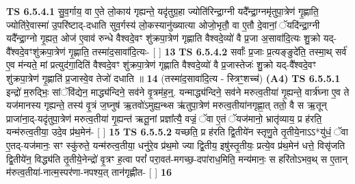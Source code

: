 \documentclass[17pt]{extarticle}
\begin{document}
                                        \textbf{ TS 6.5.4.1} \newline
                  सु॒व॒र्गाय॒ वा ए॒ते लो॒काय॑ गृह्यन्ते॒ यदृ॑तुग्र॒हा ज्योति॑रिन्द्रा॒ग्नी यदै᳚न्द्रा॒ग्नमृ॑तुपा॒त्रेण॑ गृ॒ह्णाति॒ ज्योति॑रे॒वास्मा॑ उ॒परि॑ष्टाद्-दधाति सुव॒र्गस्य॑ लो॒कस्यानु॑ख्यात्या ओजो॒भृतौ॒ वा ए॒तौ दे॒वानां॒ ॅयदि॑न्द्रा॒ग्नी यदै᳚न्द्रा॒ग्नो गृ॒ह्यत॒ ओज॑ ए॒वाव॑ रुन्धे वैश्वदे॒वꣳ शु॑क्रपा॒त्रेण॑ गृह्णाति वैश्वदे॒व्यो॑ वै प्र॒जा अ॒सावा॑दि॒त्यः शु॒क्रो यद्-वै᳚श्वदे॒वꣳशु॑क्रपा॒त्रेण॑ गृ॒ह्णाति॒ तस्मा॑द॒सावा॑दि॒त्यः- [  ] \textbf{  13} \newline
                  \newline
                                \textbf{ TS 6.5.4.2} \newline
                  सर्वाः᳚ प्र॒जाः प्र॒त्यङ्ङुदे॑ति॒ तस्मा॒थ् सर्व॑ ए॒व म॑न्यते॒ मां प्रत्युद॑गा॒दिति॑ वैश्वदे॒वꣳ शु॑क्रपा॒त्रेण॑ गृह्णाति वैश्वदे॒व्यो॑ वै प्र॒जास्तेजः॑ शु॒क्रो यद्-वै᳚श्वदे॒वꣳ शु॑क्रपा॒त्रेण॑ गृ॒ह्णाति॑ प्र॒जास्वे॒व तेजो॑ दधाति ॥ \textbf{  14} \newline
                  \newline
                      (तस्मा॑द॒सावा॑दि॒त्य - स्त्रिꣳ॒॒शच्च॑)  \textbf{(A4)} \newline \newline
                                        \textbf{ TS 6.5.5.1} \newline
                  इन्द्रो॑ म॒रुद्भिः॒ सांॅवि॑द्येन॒ माद्ध्य॑न्दिने॒ सव॑ने वृ॒त्रम॑ह॒न्॒. यन्माद्ध्य॑न्दिने॒ सव॑ने मरुत्व॒तीया॑ गृ॒ह्यन्ते॒ वार्त्र॑घ्ना ए॒व ते यज॑मानस्य गृह्यन्ते॒ तस्य॑ वृ॒त्रं ज॒घ्नुष॑ ऋ॒तवो॑ऽमुह्य॒न्थ्स ऋ॑तुपा॒त्रेण॑ मरुत्व॒तीया॑नगृह्णा॒त् ततो॒ वै स ऋ॒तून् प्राजा॑ना॒द्-यदृ॑तुपा॒त्रेण॑ मरुत्व॒तीया॑ गृ॒ह्यन्त॑ ऋतू॒नां प्रज्ञा᳚त्यै॒ वज्रं॒ ॅवा ए॒तं ॅयज॑मानो॒ भ्रातृ॑व्याय॒ प्र ह॑रति॒ यन्म॑रुत्व॒तीया॒ उदे॒व प्र॑थ॒मेन॑- [  ] \textbf{  15} \newline
                  \newline
                                \textbf{ TS 6.5.5.2} \newline
                  यच्छति॒ प्र ह॑रति द्वि॒तीये॑न स्तृणु॒ते तृ॒तीये॒नाऽऽ*यु॑धं॒ ॅवा ए॒तद्-यज॑मानः॒ सꣳ स्कु॑रुते॒ यन्म॑रुत्व॒तीया॒ धनु॑रे॒व प्र॑थ॒मो ज्या द्वि॒तीय॒ इषु॑स्तृ॒तीयः॒ प्रत्ये॒व प्र॑थ॒मेन॑ धत्ते॒ विसृ॑जति द्वि॒तीये॑न॒ विद्ध्य॑ति तृ॒तीये॒नेन्द्रो॑ वृ॒त्रꣳ ह॒त्वा परां᳚ परा॒वत॑-मगच्छ॒-दपा॑राध॒मिति॒ मन्य॑मानः॒ स हरि॑तोऽभव॒थ् स ए॒तान् म॑रुत्व॒तीया॑-नात्म॒स्पर॑णा-नपश्य॒त् तान॑गृह्णीत- [  ] \textbf{  16} \newline
                  \newline
\end{document}
